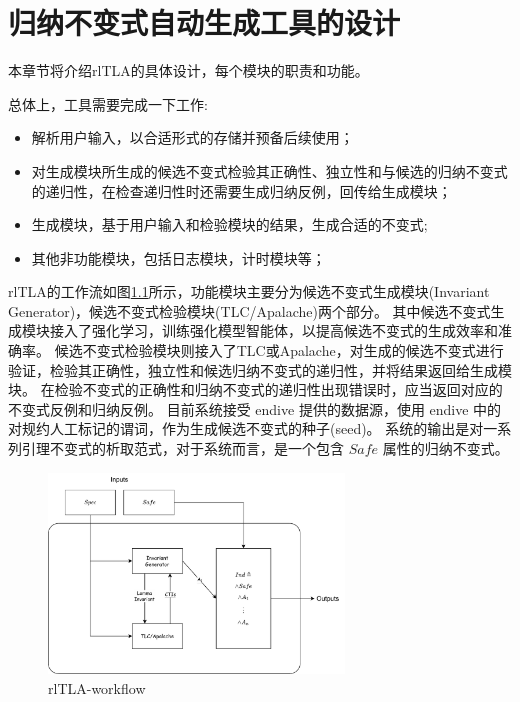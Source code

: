 \chapter{归纳不变式自动生成工具的设计}\label{chap:design}

本章节将介绍rlTLA的具体设计，每个模块的职责和功能。

总体上，工具需要完成一下工作:
\begin{itemize}
    \item 解析用户输入，以合适形式的存储并预备后续使用；
    \item 对生成模块所生成的候选不变式检验其正确性、独立性和与候选的归纳不变式的递归性，在检查递归性时还需要生成归纳反例，回传给生成模块；
    \item 生成模块，基于用户输入和检验模块的结果，生成合适的不变式;
    \item 其他非功能模块，包括日志模块，计时模块等；
\end{itemize}

rlTLA的工作流如图\ref{fig:rltla}所示，功能模块主要分为候选不变式生成模块(Invariant Generator)，候选不变式检验模块(TLC/Apalache)两个部分。
其中候选不变式生成模块接入了强化学习，训练强化模型智能体，以提高候选不变式的生成效率和准确率。
候选不变式检验模块则接入了TLC或Apalache，对生成的候选不变式进行验证，检验其正确性，独立性和候选归纳不变式的递归性，并将结果返回给生成模块。
在检验不变式的正确性和归纳不变式的递归性出现错误时，应当返回对应的不变式反例和归纳反例。
目前系统接受 endive 提供的数据源，使用 endive 中的对规约人工标记的谓词，作为生成候选不变式的种子(seed)。
系统的输出是对一系列引理不变式的析取范式，对于系统而言，是一个包含 $Safe$ 属性的归纳不变式。

\begin{figure}[h]
    \centering
    \includegraphics[width=0.7\textwidth]{figures/workflow.pdf}
    \caption{rlTLA-workflow}
    \label{fig:rltla}
\end{figure}

